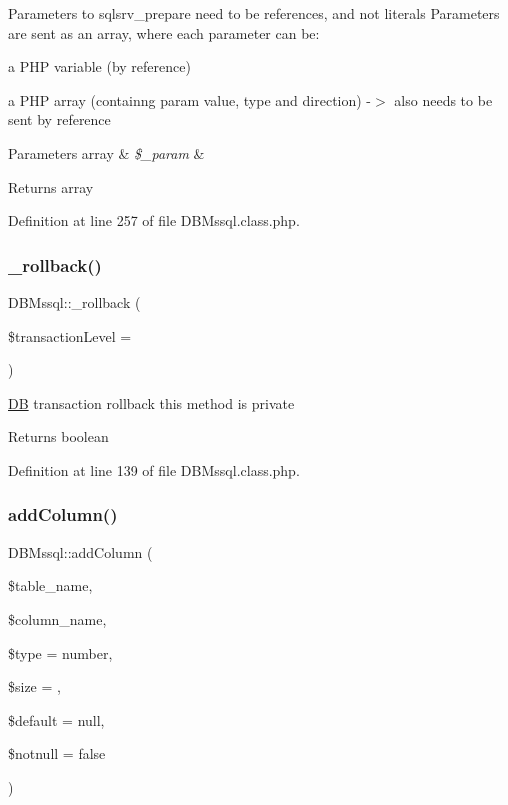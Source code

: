 Parameters to sqlsrv\+\_\+prepare need to be references, and not literals Parameters are sent as an array, where each parameter can be\+:
\begin{DoxyItemize}
\item a P\+HP variable (by reference)
\item a P\+HP array (containng param value, type and direction) -\/$>$ also needs to be sent by reference 
\begin{DoxyParams}[1]{Parameters}
array & {\em \$\+\_\+param} & \\
\hline
\end{DoxyParams}
\begin{DoxyReturn}{Returns}
array 
\end{DoxyReturn}

\end{DoxyItemize}

Definition at line 257 of file D\+B\+Mssql.\+class.\+php.

\hypertarget{classDBMssql_a35fd47dce4ad5dabbc3b994f5774afb7}{}\label{classDBMssql_a35fd47dce4ad5dabbc3b994f5774afb7} 
\subsubsection{\texorpdfstring{\+\_\+rollback()}{\_rollback()}}
{\footnotesize\ttfamily D\+B\+Mssql\+::\+\_\+rollback (\begin{DoxyParamCaption}\item[{}]{\$transaction\+Level = {} }\end{DoxyParamCaption})}

\hyperlink{classDB}{DB} transaction rollback this method is private \begin{DoxyReturn}{Returns}
boolean 
\end{DoxyReturn}


Definition at line 139 of file D\+B\+Mssql.\+class.\+php.

\hypertarget{classDBMssql_af9ca9b154ba965d089216bbc72f39a34}{}\label{classDBMssql_af9ca9b154ba965d089216bbc72f39a34} 
\subsubsection{\texorpdfstring{add\+Column()}{addColumn()}}
{\footnotesize\ttfamily D\+B\+Mssql\+::add\+Column (\begin{DoxyParamCaption}\item[{}]{\$table\+\_\+name,  }\item[{}]{\$column\+\_\+name,  }\item[{}]{\$type = {\ttfamily \textquotesingle{}number\textquotesingle{}},  }\item[{}]{\$size = {\ttfamily \textquotesingle{}\textquotesingle{}},  }\item[{}]{\$default = {\ttfamily null},  }\item[{}]{\$notnull = {\ttfamily false} }\end{DoxyParamCaption})}

